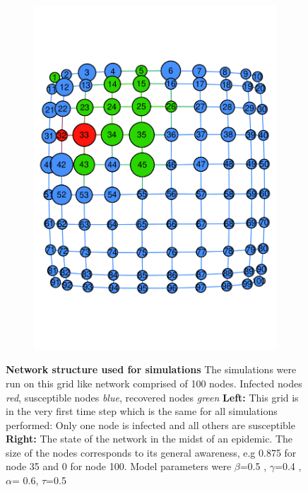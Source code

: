 \documentclass[11pt]{article}
\begin{document}
\begin{figure}[t]
\begin{subfigure}[b]{0.49\textwidth}
    	\includegraphics[width=\textwidth]{grid_run.pdf}
        \label{fig:running_grid}
	\end{subfigure}
    \caption{\textbf{Network structure used for simulations} The simulations were run on this grid like network comprised of 100 nodes. Infected nodes \textit{red}, susceptible nodes \textit{blue}, recovered nodes \textit{green} \textbf{Left:} This grid is in the very first time step which is the same for all simulations performed: Only one node is infected and all others are susceptible \textbf{Right:} The state of the network in the midst of an epidemic. The size of the nodes corresponds to its general awareness, e.g 0.875 for node 35 and 0 for node 100. Model parameters were $ \beta$=0.5 , $ \gamma$=0.4 , $ \alpha$= 0.6, $ \tau$=0.5 }
    \label{fig:grid}
\end{figure}
\end{document}

